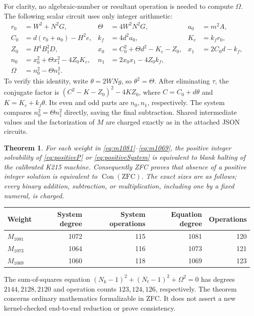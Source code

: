 \documentclass[11pt,letterpaper]{article}
\newtheorem{theorem}{Theorem}[section]
\theoremstyle{remark}
\begin{document}
For clarity, no algebraic-number or resultant operation is needed to
compute $\Omega$. The following scalar circuit uses only integer arithmetic:
\begin{align*}
 r_0&=W^2+N^2G,&\Theta&=4W^2N^2G,&a_0&=m^2A,\\
 C_0&=d(r_0+a_0)-H^2e,&k_f&=4d^2a_0,&K_c&=k_fr_0,\\
 Z_0&=H^4B_1^2D,&x_0&=C_0^2+\Theta d^2-K_c-Z_0,
   &x_1&=2C_0d-k_f,\\
 n_0&=x_0^2+\Theta x_1^2-4Z_0K_c,
   &n_1&=2x_0x_1-4Z_0k_f,\\
 \Omega&=n_0^2-\Theta n_1^2.
\end{align*}
To verify this identity, write $\theta=2WN g$, so $\theta^2=\Theta$.
After eliminating $\tau$, the conjugate factor is
$(C^2-K-Z_0)^2-4KZ_0$, where
$C=C_0+d\theta$ and $K=K_c+k_f\theta$.
Its even and odd parts are $n_0,n_1$, respectively.
The system compares $n_0^2=\Theta n_1^2$ directly, saving the final
subtraction. Shared intermediate values and the factorization of $M$ are
charged exactly as in the attached JSON circuits.

\begin{theorem}\label{thm:positive12}
For each weight in \eqref{eq:m1081}--\eqref{eq:m1069}, the positive
integer solvability of \eqref{eq:positiveP} or
\eqref{eq:positiveSystem} is equivalent to blank halting of the calibrated
K215 machine. Consequently ZFC proves that absence of a positive integer
solution is equivalent to $\operatorname{Con}(\mathrm{ZFC})$.
The exact sizes are as follows; every binary addition, subtraction, or
multiplication, including one by a fixed numeral, is charged.
\end{theorem}

\begin{center}
\begin{tabular}{lrrrr}
\hline
Weight & System degree & System operations & Equation degree & Operations\\
\hline
$M_{1081}$ &1072&115&1081&120\\
$M_{1073}$ &1064&116&1073&121\\
$M_{1069}$ &1060&118&1069&123\\
\hline
\end{tabular}
\end{center}

The sum-of-squares equation
$(N_k-1)^2+(N_t-1)^2+\Omega^2=0$ has degrees
$2144,2128,2120$ and operation counts $123,124,126$, respectively.
The theorem concerns ordinary mathematics formalizable in ZFC. It does
not assert a new kernel-checked end-to-end reduction or prove consistency.
\end{document}
